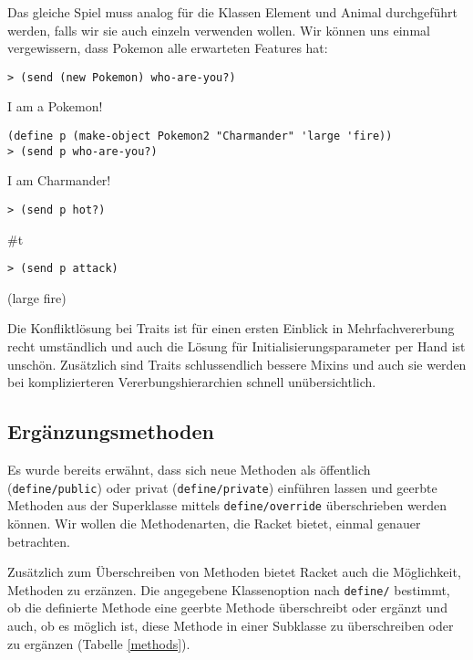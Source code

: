 Das gleiche Spiel muss analog für die Klassen Element und Animal durchgeführt werden, falls wir sie auch einzeln verwenden wollen. Wir können uns einmal vergewissern, dass Pokemon alle erwarteten Features hat:

\begin{lstlisting}
> (send (new Pokemon) who-are-you?)
\end{lstlisting}
{\routput {\qq}I am a Pokemon!\qq}

\begin{lstlisting}
(define p (make-object Pokemon2 "Charmander" 'large 'fire))
> (send p who-are-you?)
\end{lstlisting}
{\routput {\qq}I am Charmander!\qq}

\begin{lstlisting}
> (send p hot?)
\end{lstlisting}
{\routput \#t}

\begin{lstlisting}
> (send p attack)
\end{lstlisting}
{\rsymbol (large fire)}

Die Konfliktlösung bei Traits ist für einen ersten Einblick in Mehrfachvererbung recht umständlich und auch die Lösung für Initialisierungsparameter per Hand ist unschön. Zusätzlich sind Traits schlussendlich bessere Mixins und auch sie werden bei komplizierteren Vererbungshierarchien schnell unübersichtlich.

\subsection{Ergänzungsmethoden}

Es wurde bereits erwähnt, dass sich neue Methoden als öffentlich (\texttt{define/public}) oder privat (\texttt{define/private}) einführen lassen und geerbte Methoden aus der Superklasse mittels \texttt{define/override} überschrieben werden können. Wir wollen die Methodenarten, die Racket bietet, einmal genauer betrachten. 

Zusätzlich zum Überschreiben von Methoden bietet Racket auch die Möglichkeit, Methoden zu erzänzen. Die angegebene Klassenoption nach \texttt{define/} bestimmt, ob die definierte Methode eine geerbte Methode überschreibt oder ergänzt und auch, ob es möglich ist, diese Methode in einer Subklasse zu überschreiben oder zu ergänzen (Tabelle \ref{methods}).


